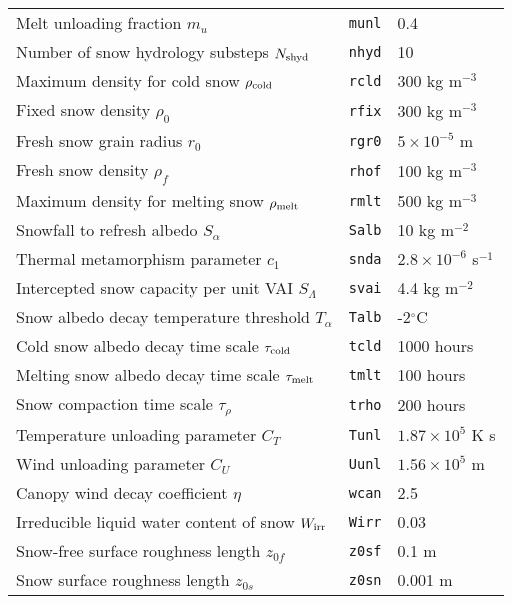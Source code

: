 \documentclass[fleqn]{article}
\begin{document}
{\begin{longtable}{|l|l|l|}
Melt unloading fraction $m_u$                      & {\tt munl} & 0.4                       \\
Number of snow hydrology substeps $N_{\rm shyd}$   & {\tt nhyd} & 10               \\
Maximum density for cold snow $\rho_{\rm cold}$    & {\tt rcld} & 300 kg m$^{-3}$  \\
Fixed snow density $\rho_0$                        & {\tt rfix} & 300 kg m$^{-3}$  \\
Fresh snow grain radius $r_0$                      & {\tt rgr0} & $5\times10^{-5}$ m  \\
Fresh snow density $\rho_f$                        & {\tt rhof} & 100 kg m$^{-3}$  \\
Maximum density for melting snow $\rho_{\rm melt}$ & {\tt rmlt} & 500 kg m$^{-3}$  \\
Snowfall to refresh albedo $S_\alpha$              & {\tt Salb} & 10 kg m$^{-2}$   \\
Thermal metamorphism parameter $c_1$ & {\tt snda}  & $2.8 \times 10^{-6}$ s$^{-1}$ \\
Intercepted snow capacity per unit VAI $S_\Lambda$ & {\tt svai} & 4.4 kg m$^{-2}$  \\
Snow albedo decay temperature threshold $T_\alpha$ & {\tt Talb} & -2$^\circ$C      \\
Cold snow albedo decay time scale $\tau_{\rm cold}$& {\tt tcld} & 1000 hours       \\
Melting snow albedo decay time scale $\tau_{\rm melt}$ & {\tt tmlt} & 100 hours    \\
Snow compaction time scale $\tau_\rho$             & {\tt trho} & 200 hours        \\
Temperature unloading parameter $C_T$              & {\tt Tunl} & $1.87 \times 10^5$ K s  \\
Wind unloading parameter $C_U$                     & {\tt Uunl} & $1.56 \times 10^5$ m    \\
Canopy wind decay coefficient $\eta$               & {\tt wcan} & 2.5              \\
Irreducible liquid water content of snow $W_{\rm irr}$ & {\tt Wirr} & 0.03         \\
Snow-free surface roughness length $z_{0f}$        & {\tt z0sf} & 0.1 m            \\
Snow surface roughness length $z_{0s}$             & {\tt z0sn} & 0.001 m          \\
\hline
\end{longtable}
}
\end{document}
